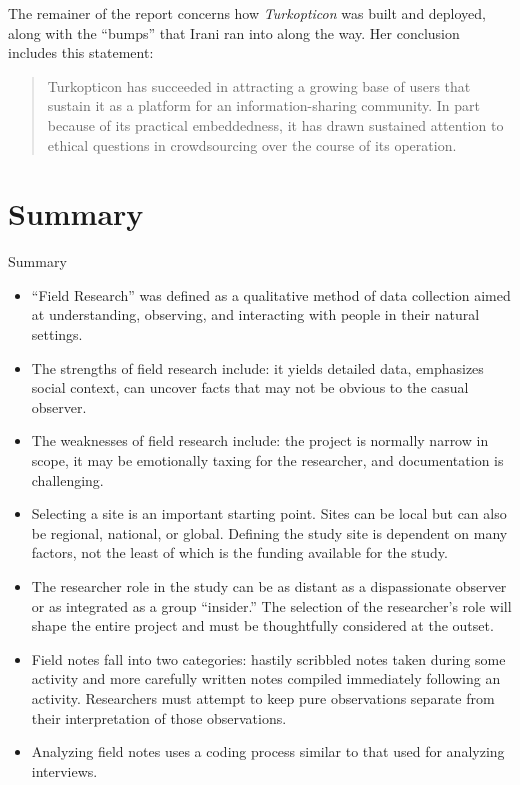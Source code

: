 The remainer of the report concerns how \textit{Turkopticon} was built and deployed, along with the ``bumps'' that Irani ran into along the way. Her conclusion includes this statement:

\begin{quote}
	Turkopticon has succeeded in attracting a growing base of users that sustain it as a platform for an information-sharing community. In part because of its practical embeddedness, it has drawn sustained attention to ethical questions in crowdsourcing over the course of its operation.
\end{quote}



\section{Summary}\label{ch11:summary}

\begin{center}
	\begin{tkawybox}{Summary}
		\begin{itemize}
			\item ``Field Research'' was defined as a qualitative method of data collection aimed at understanding, observing, and interacting with people in their natural settings.
			\item The strengths of field research include: it yields detailed data, emphasizes social context, can uncover facts that may not be obvious to the casual observer.
			\item The weaknesses of field research include: the project is normally narrow in scope, it may be emotionally taxing for the researcher, and documentation is challenging.
			\item Selecting a site is an important starting point. Sites can be local but can also be regional, national, or global. Defining the study site is dependent on many factors, not the least of which is the funding available for the study.
			\item The researcher role in the study can be as distant as a dispassionate observer or as integrated as a group ``insider.'' The selection of the researcher's role will shape the entire project and must be thoughtfully considered at the outset.
			\item Field notes fall into two categories: hastily scribbled notes taken during some activity and more carefully written notes compiled immediately following an activity. Researchers must attempt to keep pure observations separate from their interpretation of those observations.
			\item Analyzing field notes uses a coding process similar to that used for analyzing interviews.
		\end{itemize}
	\end{tkawybox}
\end{center}
